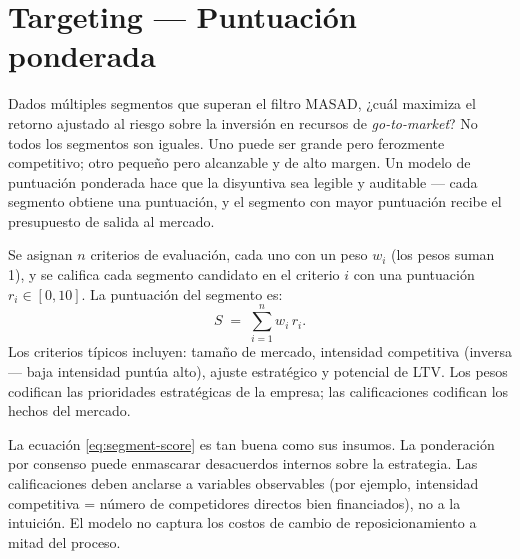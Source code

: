 \section{Targeting --- Puntuación ponderada}\label{sec:targeting}

Dados múltiples segmentos que superan el filtro MASAD, ¿cuál maximiza el retorno ajustado al riesgo sobre la inversión en recursos de \emph{go-to-market}? No todos los segmentos son iguales. Uno puede ser grande pero ferozmente competitivo; otro pequeño pero alcanzable y de alto margen. Un modelo de puntuación ponderada hace que la disyuntiva sea legible y auditable --- cada segmento obtiene una puntuación, y el segmento con mayor puntuación recibe el presupuesto de salida al mercado.

Se asignan \(n\) criterios de evaluación, cada uno con un peso \(w_i\) (los pesos suman 1), y se califica cada segmento candidato en el criterio \(i\) con una puntuación \(r_i \in [0,10]\). La puntuación del segmento es:
\begin{equation}\label{eq:segment-score}
  S \;=\; \sum_{i=1}^{n} w_i\, r_i .
\end{equation}
Los criterios típicos incluyen: tamaño de mercado, intensidad competitiva (inversa --- baja intensidad puntúa alto), ajuste estratégico y potencial de LTV. Los pesos codifican las prioridades estratégicas de la empresa; las calificaciones codifican los hechos del mercado.

La ecuación \cref{eq:segment-score} es tan buena como sus insumos. La ponderación por consenso puede enmascarar desacuerdos internos sobre la estrategia. Las calificaciones deben anclarse a variables observables (por ejemplo, intensidad competitiva = número de competidores directos bien financiados), no a la intuición. El modelo no captura los costos de cambio de reposicionamiento a mitad del proceso.

